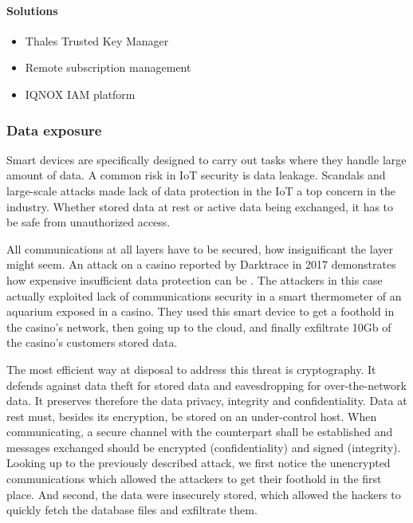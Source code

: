\paragraph{Solutions}

\begin{itemize}
	\item Thales Trusted Key Manager
	\item Remote subscription management
	\item IQNOX IAM platform
\end{itemize}


\subsubsection{Data exposure}

Smart devices are specifically designed to carry out tasks where they handle large amount of data. A common risk in IoT security is data leakage. Scandals and large-scale attacks made lack of data protection in the IoT a top concern in the industry. Whether stored data at rest or active data being exchanged, it has to be safe from unauthorized access.

All communications at all layers have to be secured, how insignificant the layer might seem. An attack on a casino reported by Darktrace in 2017 demonstrates how expensive insufficient data protection can be \cite{thesun}. The attackers in this case actually exploited lack of communications security in a smart thermometer of an aquarium exposed in a casino. They used this smart device to get a foothold in the casino’s network, then going up to the cloud, and finally exfiltrate 10Gb of the casino’s customers stored data.

The most efficient way at disposal to address this threat is cryptography. It defends against data theft for stored data and eavesdropping for over-the-network data. It preserves therefore the data privacy, integrity and confidentiality. Data at rest must, besides its encryption, be stored on an under-control host. When communicating, a secure channel with the counterpart shall be established and messages exchanged should be encrypted (confidentiality) and signed (integrity). Looking up to the previously described attack, we first notice the unencrypted communications which allowed the attackers to get their foothold in the first place. And second, the data were insecurely stored, which allowed the hackers to quickly fetch the database files and exfiltrate them.

